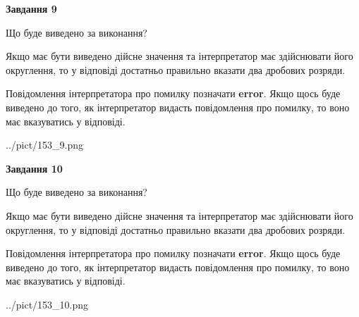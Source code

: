 \documentclass[12pt, ukrainian]{article}
\begin{document}
{\begin {Large}
{\begin {center}\textbf{Завдання 9}\end {center}}\par
Що буде виведено за виконання? \par

Якщо має бути виведено дійсне значення та інтерпретатор має здійснювати його округлення, 
то у відповіді достатньо правильно вказати два дробових розряди.

Повідомлення інтерпретатора про помилку позначати \textbf{error}.
Якщо щось буде виведено до того, як інтерпретатор видасть повідомлення про помилку, 
то воно має вказуватись у відповіді. \par

\begin{center}
	{../pict/153_9.png}
\end{center}
\newpage

{\begin {center}\textbf{Завдання 10}\end {center}}\par
Що буде виведено за виконання? \par

Якщо має бути виведено дійсне значення та інтерпретатор має здійснювати його округлення, 
то у відповіді достатньо правильно вказати два дробових розряди.

Повідомлення інтерпретатора про помилку позначати \textbf{error}.
Якщо щось буде виведено до того, як інтерпретатор видасть повідомлення про помилку, 
то воно має вказуватись у відповіді. \par

\begin{center}
	{../pict/153_10.png}
\end{center}
\newpage

\end {Large}}
\end{document}
